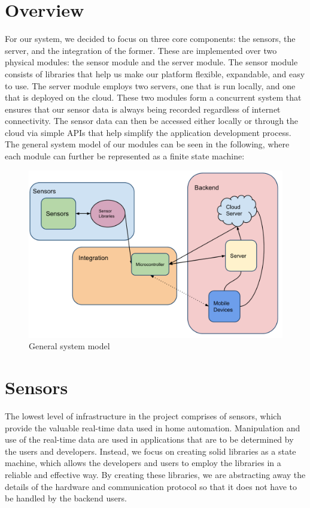 \documentclass[10pt,twocolumn]{article}
\begin{document}
\section*{Overview}
For our system, we decided to focus on three core components: the sensors, the server, and the integration of the former. These are implemented over two physical modules: the sensor module and the server module. The sensor module consists of libraries that help us make our platform flexible, expandable, and easy to use. The server module employs two servers, one that is run locally, and one that is deployed on the cloud. These two modules form a concurrent system that ensures that our sensor data is always being recorded regardless of internet connectivity. The sensor data can then be accessed either locally or through the cloud via simple APIs that help simplify the application development process. The general system model of our modules can be seen in the following, where each module can further be represented as a finite state machine:
 \begin{figure}[h]
  \centering
    \includegraphics[scale=0.35]{generalmodel.png}
  \caption{General system model}
  \label{fig:gsm}
\end{figure}
\section*{Sensors}
The lowest level of infrastructure in the project comprises of sensors, which provide the valuable real-time data used in home automation. Manipulation and use of the real-time data are used in applications that are to be determined by the users and developers. Instead, we focus on creating solid libraries as a state machine, which allows the developers and users to employ the libraries in a reliable and effective way. By creating these libraries, we are abstracting away the details of the hardware and communication protocol so that it does not have to be handled by the backend users. 
\end{document}
